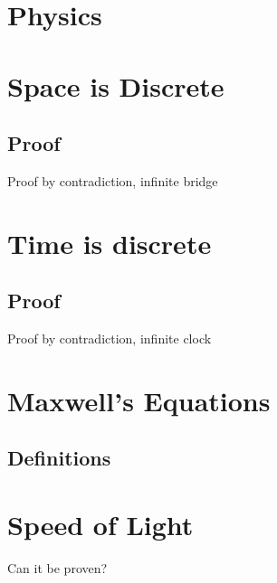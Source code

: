 \documentclass[11pt]{article}
\begin{document}
\section*{Physics}

\section{Space is Discrete}
\subsection{Proof}
Proof by contradiction, infinite bridge

\section{Time is discrete}
\subsection{Proof}
Proof by contradiction, infinite clock

\section{Maxwell's Equations}
\subsection{Definitions}

\section{Speed of Light}
Can it be proven?
\end{document}
